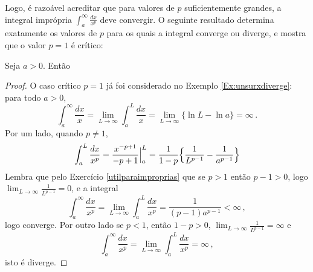 \begin{center}
\begin{bmlimage}\end{bmlimage}
\end{center}

Logo, é razoável acreditar que para
valores de $p$ suficientemente grandes, a integral
imprópria $\int_a^\infty\frac{dx}{x^p}$ deve convergir.
O seguinte resultado determina exatamente os valores de $p$ para os quais a
integral converge ou diverge, e mostra que o valor $p=1$ é crítico:

\begin{teo}\label{Teo:ConvSerieHarmon} Seja $a>0$. Então
\end{teo}
\begin{proof}
O caso crítico $p=1$ já foi considerado no Exemplo \eqref{Ex:unsurxdiverge}:
para todo 
$a>0$,
$$\int_a^\infty\frac{dx}{x}=\lim_{L\to\infty}\int_a^L\frac{dx}{x}=\lim_{L\to
\infty}\bigl\{\ln L-\ln a\big\}=\infty\,.$$
Por um lado, quando $p\neq 1$, 
$$\int_a^L\frac{dx}{x^p}=\frac{x^{-p+1}}{-p+1}\Big|_a^L
=\frac{1}{1-p}\Bigl\{ \frac{1}{L^{p-1}}-\frac{1}{a^{p-1}}\Bigr\}
$$
Lembra que pelo Exercício \ref{utilparaimproprias} que se 
$p>1$ então $p-1>0$, logo $\lim_{L\to\infty}\frac{1}{L^{p-1}}=0$, e a
integral 
$$\int_a^\infty\frac{dx}{x^p}=\lim_{L\to\infty}\int_a^L\frac{dx}{x^p}
=\frac { 1 } { (p-1)a^{p-1}}<\infty\,,$$ logo converge.
Por outro lado se $p<1$, então $1-p>0$,
$\lim_{L\to\infty}\frac{1}{L^{p-1}}=\infty$ e
$$\int_a^\infty\frac{dx}{x^p}=\lim_{L\to\infty}\int_a^L\frac{dx}{x^p}=\infty\,,
$$
isto é diverge.
\end{proof}

